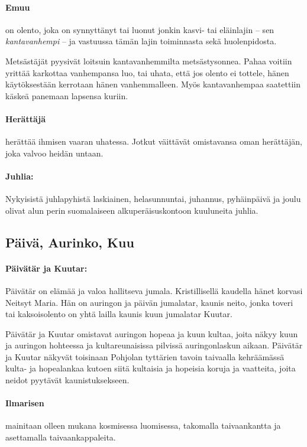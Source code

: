   \paragraph{Emuu} on olento, joka on synnyttänyt tai luonut jonkin kasvi- tai eläinlajin --
    sen \emph{kantavanhempi} -- ja vastuussa tämän lajin toiminnasta sekä huolenpidosta. \par
    Metsästäjät pyysivät loitsuin kantavanhemmilta metsästysonnea. Pahaa voitiin yrittää
    karkottaa vanhempansa luo, tai uhata, että jos olento ei tottele, hänen käytöksestään
    kerrotaan hänen vanhemmalleen. Myös kantavanhempaa saatettiin käskeä panemaan lapsensa
    kuriin.
  \paragraph{Herättäjä} herättää ihmisen vaaran uhatessa. Jotkut väittävät omistavansa oman 
    herättäjän, joka valvoo heidän untaan. 
  \paragraph{Juhlia:} Nykyisistä juhlapyhistä laskiainen, helasunnuntai, juhannus, pyhäinpäivä ja 
    joulu olivat alun perin suomalaiseen alkuperäisuskontoon kuuluneita juhlia.


\subsection{Päivä, Aurinko, Kuu} 
  
  \paragraph{Päivätär ja Kuutar:} Päivätär on elämää ja valoa hallitseva jumala. Kristillisellä kaudella hänet 
    korvasi Neitsyt Maria. Hän on auringon ja päivän jumalatar, kaunis neito, jonka toveri tai 
    kaksois\-olento on yhtä lailla kaunis kuun jumalatar Kuutar. \par
    Päivätär ja Kuutar omistavat auringon hopeaa ja kuun kultaa, joita näkyy kuun ja auringon 
    hohteessa ja kultareunaisissa pilvissä auringonlaskun aikaan. Päivätär ja Kuutar näkyvät 
    toisinaan Pohjolan tyttärien tavoin taivaalla kehräämässä kulta- ja hopealankaa kutoen 
    siitä kultaisia ja hopeisia koruja ja vaatteita, joita neidot pyytävät kaunistuksekseen.
  
  \paragraph{Ilmarisen} mainitaan olleen mukana kosmisessa luomisessa, takomalla taivaankantta 
    ja asettamalla taivaankappaleita.

